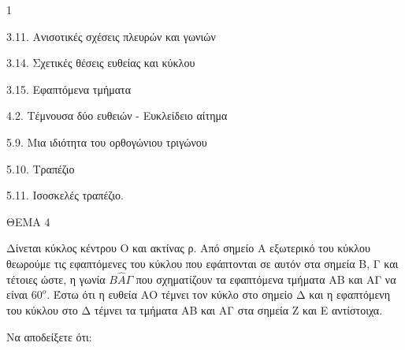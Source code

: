 \begin{ylh}{1}
    \item 3.11. Ανισοτικές σχέσεις πλευρών και γωνιών
    \item 3.14. Σχετικές θέσεις ευθείας και κύκλου
    \item 3.15. Εφαπτόμενα τμήματα
    \item 4.2. Τέμνουσα δύο ευθειών - Ευκλείδειο αίτημα
    \item 5.9. Μια ιδιότητα του ορθογώνιου τριγώνου
    \item 5.10. Τραπέζιο
    \item 5.11. Ισοσκελές τραπέζιο.
\end{ylh}

ΘΕΜΑ 4

Δίνεται κύκλος κέντρου Ο και ακτίνας ρ. Από σημείο Α εξωτερικό του κύκλου θεωρούμε τις εφαπτόμενες του κύκλου που εφάπτονται σε αυτόν στα σημεία Β, Γ και τέτοιες ώστε, η γωνία $Β\widehat{Α}\Gamma$ που σχηματίζουν τα εφαπτόμενα τμήματα ΑΒ και ΑΓ να είναι $60^{ο}$. Έστω ότι η ευθεία ΑΟ τέμνει τον κύκλο στο σημείο Δ και η εφαπτόμενη του κύκλου στο Δ τέμνει τα τμήματα ΑΒ και ΑΓ στα σημεία Ζ και Ε αντίστοιχα.

Να αποδείξετε ότι:

